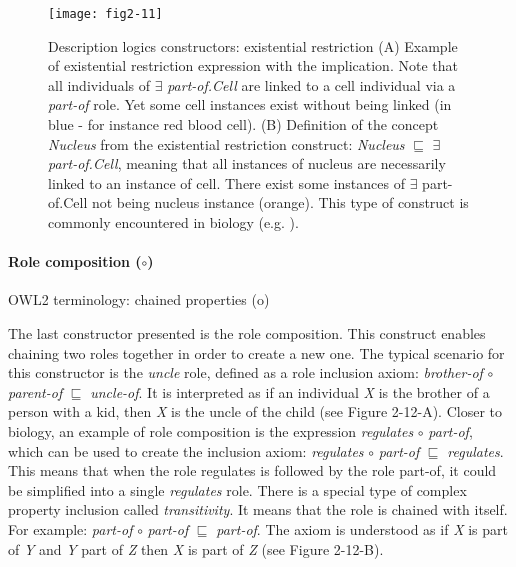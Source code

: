 \begin{figure}[H]
    \centering
    \texttt{[image: fig2-11]}
    \caption{Description logics constructors: existential restriction (A) Example of existential restriction expression with the implication. Note that all individuals of $ \exists $ \emph{part-of.Cell} are linked to a cell individual via a \emph{part-of} role. Yet some cell instances exist without being linked (in blue - for instance red blood cell). (B) Definition of the concept \emph{Nucleus} from the existential restriction construct: \emph{Nucleus} $ \sqsubseteq $ $ \exists $ \emph{part-of.Cell}, meaning that all instances of nucleus are necessarily linked to an instance of cell. There exist some instances of $ \exists $ part-of.Cell not being nucleus instance (orange). This type of construct is commonly encountered in biology (e.g. \cite{ashburner2000gene}).}
    \label{fig2-11}
\end{figure}

\paragraph{\textbf{Role composition ($ \circ $)}\\}
OWL2 terminology: chained properties (o)

The last constructor presented is the role composition. This construct enables chaining two roles together in order to create a new one. The typical scenario for this constructor is the \emph{uncle} role, defined as a role inclusion axiom: \emph{brother-of} $ \circ $ \emph{parent-of} $ \sqsubseteq $ \emph{uncle-of}. It is interpreted as if an individual \emph{X} is the brother of a person with a kid, then \emph{X} is the uncle of the child (see Figure 2-12-A). Closer to biology, an example of role composition is the expression \emph{regulates} $ \circ $ \emph{part-of}, which can be used to create the inclusion axiom: \emph{regulates} $ \circ $ \emph{part-of} $ \sqsubseteq $ \emph{regulates}. This means that when the role regulates is followed by the role part-of, it could be simplified into a single \emph{regulates} role. There is a special type of complex property inclusion called \emph{transitivity}. It means that the role is chained with itself. For example: \emph{part-of} $ \circ $ \emph{part-of} $ \sqsubseteq $ \emph{part-of}. The axiom is understood as if \emph{X} is part of \emph{Y} and \emph{Y} part of \emph{Z} then \emph{X} is part of \emph{Z} (see Figure 2-12-B).

